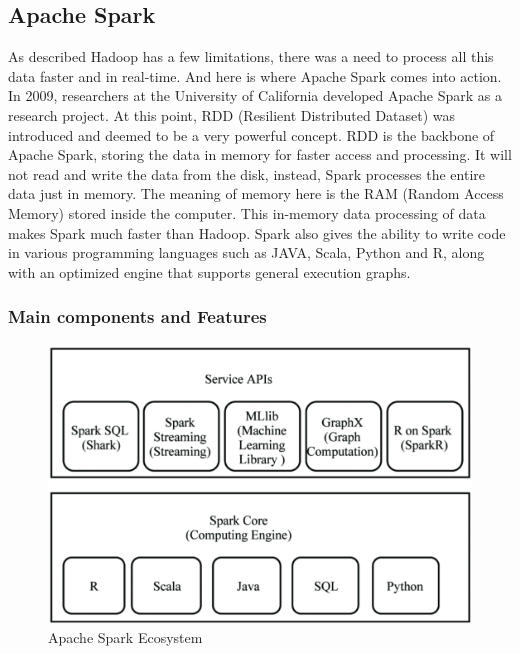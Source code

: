 \subsection{Apache Spark}
As described Hadoop has a few limitations, there was a need to process all this data faster and in real-time. And here is where Apache Spark comes into action. In 2009, researchers at the University of California developed Apache Spark as a research project. At this point, RDD (Resilient Distributed Dataset) was introduced and deemed to be a very powerful concept.\cite{apache-spark}
RDD is the backbone of Apache Spark, storing the data in memory for faster access and processing. It will not read and write the data from the disk, instead, Spark processes the entire data just in memory. The meaning of memory here is the RAM (Random Access Memory) stored inside the computer. This in-memory data processing of data makes Spark much faster than Hadoop.
Spark also gives the ability to write code in various programming languages such as JAVA, Scala, Python and R, along with an optimized engine that supports general execution graphs.

\subsubsection{Main components and Features}

\begin{figure}[ht]
    \centering
    \includegraphics[width=1\linewidth]{images/Spark_Eco.png}
    \caption{Apache Spark Ecosystem}
    \label{fig:spark-eco}
\end{figure}

